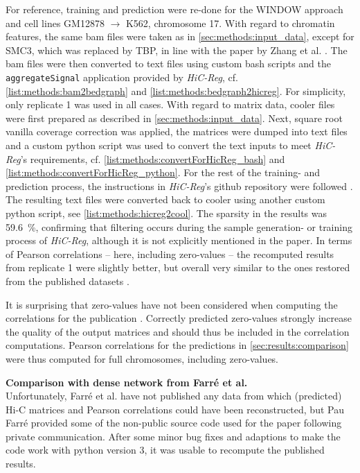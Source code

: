 For reference, training and prediction were re-done for the WINDOW approach and cell lines GM12878 $\rightarrow$ K562, chromosome 17.
With regard to chromatin features, the same bam files were taken as in \cref{sec:methods:input_data}, except for SMC3, which was replaced by TBP,
in line with the paper by Zhang et al. \cite{Zhang2019}. 
The bam files were then converted to text files using custom bash scripts and the \texttt{aggregateSignal} application provided by \emph{HiC-Reg}, 
cf. \cref{list:methods:bam2bedgraph} and \ref{list:methods:bedgraph2hicreg}. 
For simplicity, only replicate 1 was used in all cases.
With regard to matrix data, cooler files were first prepared as described in \cref{sec:methods:input_data}.
Next, square root vanilla coverage correction was applied, the matrices were dumped into text files and a custom python script was used
to convert the text inputs to meet \emph{HiC-Reg}'s requirements, cf. \cref{list:methods:convertForHicReg_bash} and \ref{list:methods:convertForHicReg_python}.
For the rest of the training- and prediction process, the instructions in \emph{HiC-Reg}'s github repository were followed \cite{Zhang2019}.
The resulting text files were converted back to cooler using another custom python script, see \cref{list:methods:hicreg2cool}.
The sparsity in the results was \SI{59.6}{\percent}, confirming that filtering occurs during the sample generation- or training process of \emph{HiC-Reg},
although it is not explicitly mentioned in the paper.
In terms of Pearson correlations -- here, including zero-values -- the recomputed results from replicate 1 were slightly better,
but overall very similar to the ones restored from the published datasets \cite{ShiluZhang2019,ShiluZhang2019a}. 

It is surprising that zero-values have not been considered when computing the correlations for the publication \cite{Zhang2019}.
Correctly predicted zero-values strongly increase the quality of the output matrices 
and should thus be included in the correlation computations.
Pearson correlations for the predictions in \cref{sec:results:comparison} were thus computed for full chromosomes, including zero-values.

\textbf{Comparison with dense network from Farr\'e et al.}\\
Unfortunately, Farr\'e et al. have not published any data from which (predicted) Hi-C matrices and Pearson correlations could have been reconstructed,
but Pau Farr\'e provided some of the non-public source code used for the paper \cite{Farre2018a} following private communication.
After some minor bug fixes and adaptions to make the code work with python version 3, it was usable to recompute the published results.


